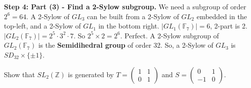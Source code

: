 \begin{solution}
\textbf{Step 4: Part (3) - Find a 2-Sylow subgroup.}
We need a subgroup of order $2^6 = 64$.
A 2-Sylow of $GL_3$ can be built from a 2-Sylow of $GL_2$ embedded in the top-left, and a 2-Sylow of $GL_1$ in the bottom right.
$|GL_1(\mathbb{F}_7)| = 6$, 2-part is 2.
$|GL_2(\mathbb{F}_7)| = 2^5 \cdot 3^2 \cdot 7$.
So $2^5 \times 2 = 2^6$. Perfect.
A 2-Sylow subgroup of $GL_2(\mathbb{F}_7)$ is the \textbf{Semidihedral group} of order 32. 
So, a 2-Sylow of $GL_3$ is $SD_{32} \times \{ \pm 1 \}$.
\end{solution}

\begin{exercise}
\label{algebra:2011:12}
Show that $SL_2(\mathbb{Z})$ is generated by $T = \begin{pmatrix} 1 & 1 \\ 0 & 1 \end{pmatrix}$ and $S = \begin{pmatrix} 0 & 1 \\ -1 & 0 \end{pmatrix}$.
\end{exercise}

